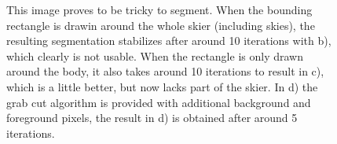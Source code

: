 \documentclass[11pt,a4paper]{article}
\begin{document}
\begin{figure}
\quad
{}

\quad
{}


\caption{This image proves to be tricky to segment. When the bounding rectangle is drawin around the whole skier (including skies), the resulting segmentation stabilizes after around 10 iterations with b), which clearly is not usable. When the rectangle is only drawn around the body, it also takes around 10 iterations to result in c), which is a little better, but now lacks part of the skier. In d) the grab cut algorithm is provided with additional background and foreground pixels, the result in d) is obtained after around 5 iterations.}%

\end{figure}
\end{document}

